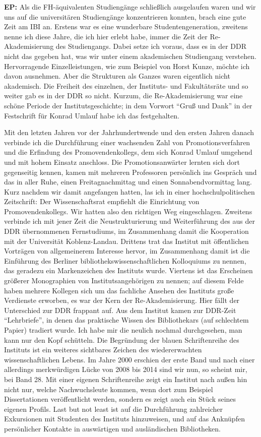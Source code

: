\documentclass[a4paper,
fontsize=11pt,
oneside,
numbers=noperiodatend,
parskip=half-,
bibliography=totoc,
final
]{scrartcl}
\begin{document}
\textbf{EP:} Als die FH-äquivalenten Studiengänge schließlich
ausgelaufen waren und wir uns auf die universitären Studiengänge
konzentrieren konnten, brach eine gute Zeit am IBI an. Erstens war es
eine wunderbare Studentengeneration, zweitens nenne ich diese Jahre, die
ich hier erlebt habe, immer die Zeit der Re-Akademisierung des
Studiengangs. Dabei setze ich voraus, dass es in der DDR nicht das
gegeben hat, was wir unter einem akademischen Studiengang verstehen.
Hervorragende Einzelleistungen, wie zum Beispiel von Horst Kunze, möchte
ich davon ausnehmen. Aber die Strukturen als Ganzes waren eigentlich
nicht akademisch. Die Freiheit des einzelnen, der Instituts- und
Fakultätsräte und so weiter gab es in der DDR so nicht. Kurzum, die
Re-Akademisierung war eine schöne Periode der Institutsgeschichte; in
dem Vorwort \enquote{Gruß und Dank} in der Festschrift für Konrad Umlauf
habe ich das festgehalten.

Mit den letzten Jahren vor der Jahrhundertwende und den ersten Jahren
danach verbinde ich die Durchführung einer wachsenden Zahl von
Promotionsverfahren und die Erfindung des Promovendenkollegs, dem sich
Konrad Umlauf umgehend und mit hohem Einsatz anschloss. Die
Promotionsanwärter lernten sich dort gegenseitig kennen, kamen mit
mehreren Professoren persönlich ins Gespräch und das in aller Ruhe,
einen Freitagnachmittag und einen Sonnabendvormittag lang. Kurz nachdem
wir damit angefangen hatten, las ich in einer hochschulpolitischen
Zeitschrift: Der Wissenschaftsrat empfiehlt die Einrichtung von
Promovendenkollegs. Wir hatten also den richtigen Weg eingeschlagen.
Zweitens verbinde ich mit jener Zeit die Neustrukturierung und
Weiterführung des aus der DDR übernommenen Fernstudiums, im Zusammenhang
damit die Kooperation mit der Universität Koblenz-Landau. Drittens trat
das Institut mit öffentlichen Vorträgen von allgemeinerem Interesse
hervor, im Zusammenhang damit ist die Einführung des Berliner
bibliothekswissenschaftlichen Kolloquiums zu nennen, das geradezu ein
Markenzeichen des Instituts wurde. Viertens ist das Erscheinen größerer
Monographien von Institutsangehörigen zu nennen; auf diesem Felde haben
mehrere Kollegen sich um das fachliche Ansehen des Instituts große
Verdienste erworben, es war der Kern der Re-Akademisierung. Hier fällt
der Unterschied zur DDR frappant auf. Aus dem Institut kamen zur
DDR-Zeit \enquote{Lehrbriefe}, in denen das praktische Wissen des
Bibliothekars (auf schlechtem Papier) tradiert wurde. Ich habe mir die
neulich nochmal durchgesehen, man kann nur den Kopf schütteln. Die
Begründung der blauen Schriftenreihe des Instituts ist ein weiteres
sichtbares Zeichen des wiedererwachten wissenschaftlichen Lebens. Im
Jahre 2000 erschien der erste Band und nach einer allerdings
merkwürdigen Lücke von 2008 bis 2014 sind wir nun, so scheint mir, bei
Band 28. Mit einer eigenen Schriftenreihe zeigt ein Institut nach außen
hin nicht nur, welche Nachwuchsleute kommen, wenn dort zum Beispiel
Dissertationen veröffentlicht werden, sondern es zeigt auch ein Stück
seines eigenen Profils. Last but not least ist auf die Durchführung
zahlreicher Exkursionen mit Studenten des Instituts hinzuweisen, und auf
das Anknüpfen persönlicher Kontakte in auswärtigen und ausländischen
Bibliotheken.
\end{document}

